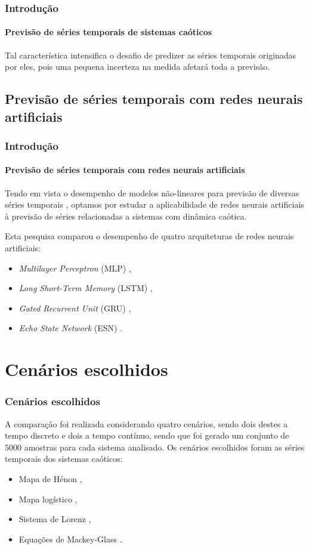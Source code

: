 \documentclass{beamer}
\begin{document}
\begin{frame}
    \frametitle{Introdução}
    \framesubtitle{Previsão de séries temporais de sistemas caóticos}
    \justifying Tal característica intensifica o desafio de predizer as séries temporais originadas por eles, pois uma pequena incerteza na medida afetará toda a previsão. 

\end{frame}

\subsection{Previsão de séries temporais com redes neurais artificiais}

\begin{frame}
    \frametitle{Introdução}
    \framesubtitle{Previsão de séries temporais com redes neurais artificiais}
    \justifying Tendo em vista o desempenho de modelos não-lineares para previsão de diversas séries temporais \cite{connor1994recurrent}, optamos por estudar a aplicabilidade de redes neurais artificiais à previsão de séries relacionadas a sistemas com dinâmica caótica. 
    
    Esta pesquisa comparou o desempenho de quatro arquiteturas de redes neurais artificiais:
    
    \begin{itemize}[<+-| alert@+>]
	\item \textit{Multilayer Perceptron} (MLP) \cite{rosenblatt1958perceptron},
	\item \textit{Long Short-Term Memory} (LSTM) \cite{connor1994recurrent},
	\item \textit{Gated Recurrent Unit} (GRU) \cite{cho2014learning},
	\item \textit{Echo State Network} (ESN) \cite{jaeger2007echo}.
    \end{itemize} 
\end{frame}

\section{Cenários escolhidos}

\begin{frame}
    \frametitle{Cenários escolhidos}
    \justifying A comparação foi realizada considerando quatro cenários, sendo dois destes a tempo discreto e dois a tempo contínuo, sendo que foi gerado um conjunto de $5000$ amostras para cada sistema analisado. Os cenários escolhidos foram as séries temporais dos sistemas caóticos:

    \begin{itemize}[<+-| alert@+>]    
    \item Mapa de Hénon \cite{henon1976two},
    \item Mapa logístico \cite{may1976simple},
    \item Sistema de Lorenz \cite{lorenz1963deterministic},
    \item Equações de Mackey-Glass \cite{mackey1977oscillation}.
    \end{itemize}
\end{frame}
\end{document}
